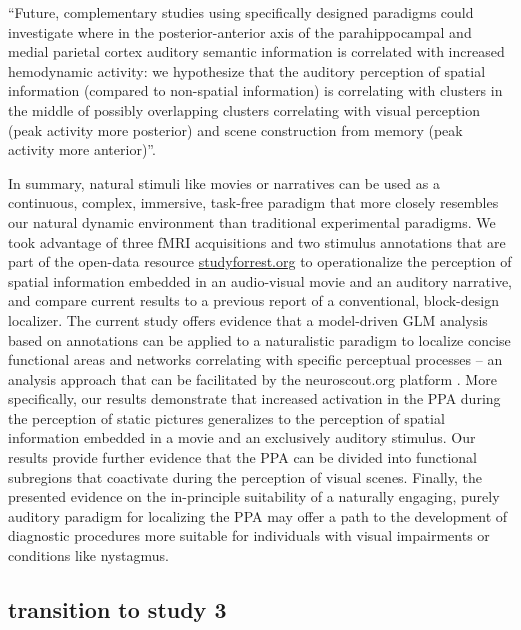 ``Future, complementary studies using specifically designed paradigms could
investigate where in the posterior-anterior axis of the parahippocampal and
medial parietal cortex auditory semantic information is correlated with
increased hemodynamic activity:
we hypothesize that the auditory perception of spatial information (compared to
non-spatial information) is correlating with clusters in the middle of possibly
overlapping clusters correlating with visual perception (peak activity more
posterior) and scene construction from memory (peak activity more anterior)''.

In summary, natural stimuli like movies \citep{eickhoff2020towards,
hasson2008neurocinematics, sonkusare2019naturalistic} or narratives
\citep{hamilton2018revolution, honey2012not, lerner2011topographic,
silbert2014coupled, wilson2008beyond} can be used as a continuous, complex,
immersive, task-free paradigm that more closely resembles our natural dynamic
environment than traditional experimental paradigms.
We took advantage of three fMRI acquisitions and two stimulus annotations that
are part of the open-data resource
\href{http://www.studyforrest.org}{studyforrest.org} to operationalize the
perception of spatial information embedded in an audio-visual movie and an
auditory narrative, and compare current results to a previous report of a
conventional, block-design localizer.
The current study offers evidence that a model-driven GLM analysis based on
annotations can be applied to a naturalistic paradigm to localize concise
functional areas and networks correlating with specific perceptual processes --
an analysis approach that can be facilitated by the neuroscout.org platform
\citep{delavega2021neuroscout}.
More specifically, our results demonstrate that increased activation in the PPA
during the perception of static pictures generalizes to the perception of
spatial information embedded in a movie and an exclusively auditory stimulus.
Our results provide further evidence that the PPA can be divided into functional
subregions that coactivate during the perception of visual scenes.
Finally, the presented evidence on the in-principle suitability of a naturally
engaging, purely auditory paradigm for localizing the PPA may offer a path to
the development of diagnostic procedures more suitable for individuals with
visual impairments or conditions like nystagmus.

\subsection{transition to study 3}


